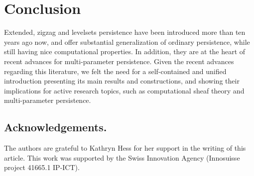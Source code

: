 \documentclass[11pt]{article}
\theoremstyle{remark}
\begin{document}



\section{Conclusion}
\label{ccl}

Extended, zigzag and levelsets persistence have been introduced more than ten years ago now, and offer substantial generalization of ordinary persistence, while still having nice computational properties. In addition, they are at the heart of recent advances for multi-parameter persistence. Given the recent advances regarding this literature, we felt the need for a self-contained and unified introduction presenting its main results and constructions, and showing their implications for active research topics, such as computational sheaf theory and multi-parameter persistence. 


\subsection*{Acknowledgements.}
The authors are grateful to Kathryn Hess for her support in the writing of this article. This work was supported by the Swiss Innovation Agency (Innosuisse project 41665.1
IP-ICT).

\printbibliography
\end{document}
